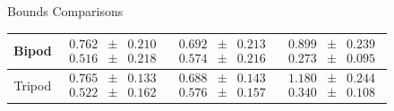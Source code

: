 \documentclass[10pt]{beamer}
\begin{document}
\begin{frame}{Bounds Comparisons}
\begin{table}[t]
\begin{center}
\begin{tabular}[c]{cccc}
        Bipod & $\begin{matrix}0.762\\0.516\end{matrix} \begin{matrix}\pm\\\pm\end{matrix} \begin{matrix}0.210\\ 0.218\end{matrix}$ & $\begin{matrix}\mathbf{0.692}\\\mathbf{0.574}\end{matrix} \begin{matrix}\pm\\\pm\end{matrix} \begin{matrix}0.213\\ 0.216\end{matrix}$ & $\begin{matrix}0.899\\0.273\end{matrix} \begin{matrix}\pm\\\pm\end{matrix} \begin{matrix}0.239\\0.095\end{matrix}$ \\
        \midrule
        Tripod & $\begin{matrix}0.765\\0.522\end{matrix} \begin{matrix}\pm\\\pm\end{matrix} \begin{matrix}0.133\\ 0.162\end{matrix}$ & $\begin{matrix}\mathbf{0.688}\\\mathbf{0.576}\end{matrix} \begin{matrix}\pm\\\pm\end{matrix} \begin{matrix}0.143\\ 0.157\end{matrix}$ & $\begin{matrix}1.180\\0.340\end{matrix} \begin{matrix}\pm\\\pm\end{matrix} \begin{matrix}0.244\\0.108\end{matrix}$ \\

\end{tabular}
\end{center}
\end{table}
\end{frame}
\end{document}
